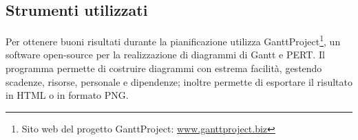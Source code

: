    \subsection{Strumenti utilizzati}
   Per ottenere buoni risultati durante la pianificazione \nomeAzienda{} utilizza GanttProject\footnote{Sito web del progetto GanttProject: \href{http://www.ganttproject.biz/}{www.ganttproject.biz}}, un software open-source per la realizzazione di diagrammi di \gls{Gantt} e \gls{PERT}. Il programma permette di costruire diagrammi con estrema facilità, gestendo scadenze, risorse, personale e dipendenze; inoltre permette di esportare il risultato in \gls{HTML} o in formato \gls{PNG}.\
